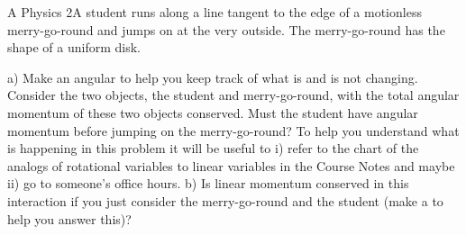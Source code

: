 \label{fnt7.3.2-2}

A Physics 2A student runs along a line tangent to the edge of a motionless merry-go-round and jumps on at the very outside. The merry-go-round has the shape of a uniform disk. 

a)  Make an angular \pchart{} to help you keep track of what is and is not changing.  Consider the two objects, the student and merry-go-round, with the total angular momentum of these two objects conserved.  Must the student have angular momentum before jumping on the merry-go-round?  To help you understand what is happening in this problem it will be useful to i) refer to the chart of the analogs of rotational variables to linear variables in the Course Notes and maybe ii) go to someone's office hours.
b)  Is linear momentum conserved in this interaction if you just consider the merry-go-round and the student (make a \pchart{} to help you answer this)?